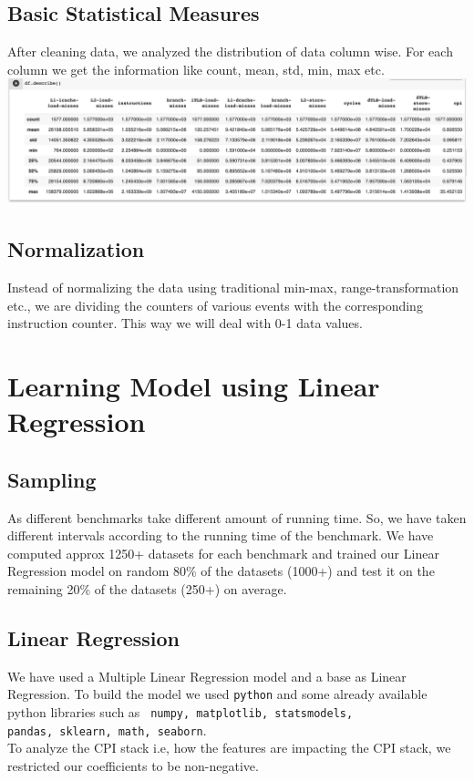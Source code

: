 \documentclass[10pt, letterpaper, IEEEtran, tikz,border=5,a4paper,fleqn]{article}
\begin{document}
\subsection{Basic Statistical Measures}

After cleaning data, we analyzed the distribution of data column wise. For each column we get the information like count, mean, std, min, max etc.\\

\noindent\includegraphics[scale=0.33]{Statistics.png}

\subsection{Normalization}

Instead of normalizing the data using traditional min-max, range-transformation etc., we are dividing the counters of various events with the corresponding instruction counter. This way we will deal with 0-1 data values.

\section{Learning Model using Linear Regression}

\subsection{Sampling}

As different benchmarks take different amount of running time. So, we have taken different intervals according to the running time of the benchmark. We have computed approx 1250+ datasets for each benchmark and trained our Linear Regression model on random 80\% of the datasets (1000+) and test it on the remaining 20\% of the datasets (250+) on average.

\subsection{Linear Regression}

We have used a Multiple Linear Regression model and a base as Linear Regression. To build the model we used \verb|python| and some already available python libraries such as \verb| numpy, matplotlib, statsmodels,|\\ \verb|pandas, sklearn, math, seaborn|.\\
To analyze the CPI stack i.e, how the features are impacting the CPI stack, we restricted our coefficients to be non-negative.
\end{document}
